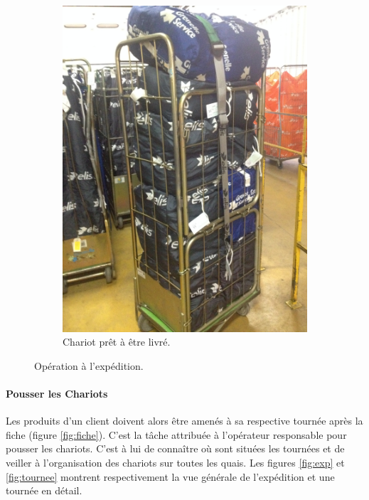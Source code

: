 \documentclass{article}
\newcommand{\rapportFigure}{0.075}
\begin{document}
\begin{figure}[h]
\begin{subfigure}{0.49\textwidth}
        \includegraphics[angle=-90,scale= \rapportFigure]{images/chariot}
        \caption{Chariot prêt à être livré.}
        \label{fig:sacs}
    \end{subfigure}
    
    \caption{Opération à l'expédition.}
\end{figure}
%
\FloatBarrier

\paragraph{Pousser les Chariots}
\label{sec:tournee}

Les produits d'un client doivent alors être amenés à sa respective tournée
après la fiche (figure \ref{fig:fiche}). C'est la tâche attribuée à
l'opérateur responsable pour pousser les chariots. C'est à lui de connaître où
sont situées les tournées et de veiller à l'organisation des chariots sur toutes
les quais. Les figures \ref{fig:exp} et \ref{fig:tournee} montrent
respectivement la vue générale de l'expédition et une tournée en détail.
\end{document}

